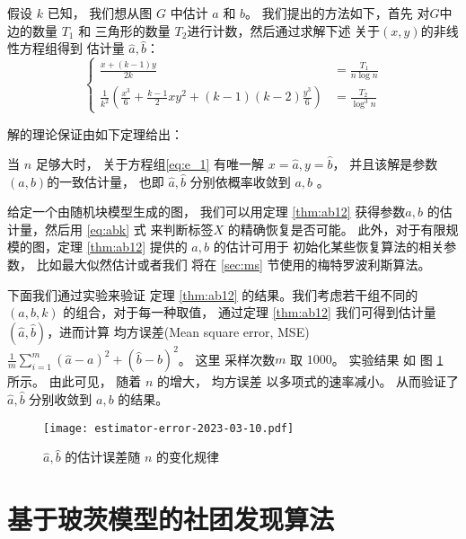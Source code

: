 假设 $k$ 已知，
我们想从图 $G$ 中估计
$a$ 和 $b$。
我们提出的方法如下，首先
对$G$中 边的数量 $T_1$ 
和 三角形的数量
$T_2$进行计数，然后通过求解下述
关于$(x,y)$的非线性方程组得到
估计量 $\hat{a}, \hat{b}$：
\begin{equation} \label{eq:e_1}
\left\{
	\begin{alignedat}{1}
	\frac{x+(k-1)y}{2k}  &= \frac{T_1}{n\log n} \\
\frac{1}{k^2}
\left(\frac{x^3}{6} + \frac{k-1}{2}xy^2 + (k-1)(k-2)\frac{y^3}{6}\right)
 &= \frac{T_2}{\log^3 n}
	\end{alignedat}
\right.
\end{equation}


解的理论保证由如下定理给出：
\begin{theorem}\label{thm:ab12}
当 $n$ 足够大时，
关于方程组\eqref{eq:e_1}
有唯一解 $x=\hat{a}, y=\hat{b}$，
并且该解是参数$(a,b)$的一致估计量，
也即 $\hat{a}, \hat{b}$ 
分别依概率收敛到 $a,b$ 。
\end{theorem}
给定一个由随机块模型生成的图，
我们可以用定理 \ref{thm:ab12} 获得参数$a,b$ 
的估计量，然后用 \eqref{eq:abk}
式
来判断标签$X$ 的精确恢复是否可能。
此外，对于有限规模的图，定理 \ref{thm:ab12} 提供的 $a,b$ 的估计可用于
初始化某些恢复算法的相关参数，
比如最大似然估计或者我们
将在 \ref{sec:ms} 节使用的梅特罗波利斯算法。

下面我们通过实验来验证
定理 \ref{thm:ab12} 的结果。我们考虑若干组不同的
$(a,b,k)$ 的组合，对于每一种取值，
通过定理 \ref{thm:ab12} 我们可得到估计量
$(\hat{a}, \hat{b})$，进而计算
均方误差(Mean square error, MSE)
$\frac{1}{m} \sum_{i=1}^m (\hat{a}-a)^2 + (\hat{b}-b)^2$。
这里  采样次数$m$ 取 $1000$。
实验结果 如
图 \ref{fig:estimator} 所示。
由此可见， 随着 $n$ 的增大，
均方误差 以多项式的速率减小。
从而验证了 $\hat{a}, \hat{b}$ 分别收敛到 $a,b$ 
的结果。

\begin{figure}[ht!]
	\centering
		\texttt{[image: estimator-error-2023-03-10.pdf]}
		\caption{ $\hat{a}, \hat{b}$ 的估计误差随
		$n$ 的变化规律 }\label{fig:estimator}
\end{figure}

\section{基于玻茨模型的社团发现算法}\label{sec:potts}
